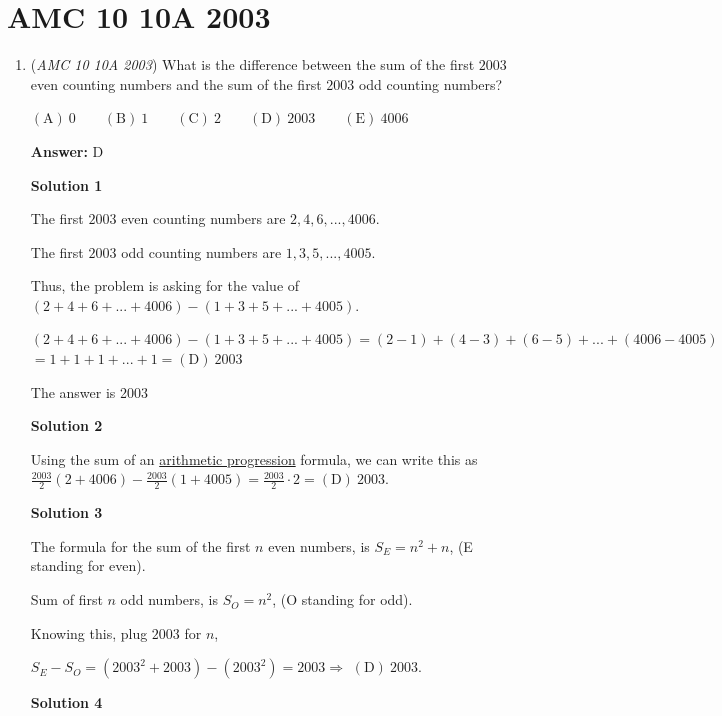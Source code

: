 \section{AMC 10 10A 2003}
        \begin{enumerate}
        	\item (\textit{AMC 10 10A 2003}) What is the difference between the sum of the first $2003$ even counting numbers and the sum of the first $2003$ odd counting numbers? 


 $\mathrm{(A) \ } 0\qquad \mathrm{(B) \ } 1\qquad \mathrm{(C) \ } 2\qquad \mathrm{(D) \ } 2003\qquad \mathrm{(E) \ } 4006$

 \textbf{Answer: }D



\textbf{Solution 1}

The first $2003$ even counting numbers are $2,4,6,...,4006$. 

 The first $2003$ odd counting numbers are $1,3,5,...,4005$. 

 Thus, the problem is asking for the value of $(2+4+6+...+4006)-(1+3+5+...+4005)$. 

 $(2+4+6+...+4006)-(1+3+5+...+4005) = (2-1)+(4-3)+(6-5)+...+(4006-4005)$
$= 1+1+1+...+1 = \boxed{\mathrm{(D)}\ 2003}$

 The answer is 2003

 



\textbf{Solution 2}

Using the sum of an \href{https://artofproblemsolving.com/wiki/index.php?title=Arithmetic\_progression}{arithmetic progression} formula, we can write this as $\frac{2003}{2}(2 + 4006) - \frac{2003}{2}(1 + 4005) = \frac{2003}{2} \cdot 2 = \boxed{\mathrm{(D)}\ 2003}$.

 


 



\textbf{Solution 3}

The formula for the sum of the first $n$ even numbers, is $S_E=n^{2}+n$, (E standing for even).

 Sum of first $n$ odd numbers, is $S_O=n^{2}$, (O standing for odd).

 Knowing this, plug $2003$ for $n$, 

 $S_E-S_O= (2003^{2}+2003)-(2003^{2})=2003 \Rightarrow$ $\boxed{\mathrm{(D)}\ 2003}$.

 



\textbf{Solution 4}


\end{enumerate}
